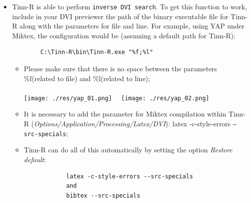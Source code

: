\begin{itemize}
  \item Tinn-R is able to perform \texttt{inverse DVI search}. To get this
    function to work, include in your DVI previewer the path of the
    binary executable file for Tinn-R along with the parameters for
    file and line.  For example, using YAP under Miktex, the configuration
    would be (assuming a default path for Tinn-R):

    \begin{footnotesize}
      \begin{verbatim}
        C:\Tinn-R\bin\Tinn-R.exe "%f;%l"
      \end{verbatim}
    \end{footnotesize}

    \begin{itemize}
      \item Please make sure that there is no space between the
        parameters \%f(related to file) and \%l(related to line);\\\\
        \texttt{[image: ./res/yap\_01.png]}~~
        \texttt{[image: ./res/yap\_02.png]}\\
      \item It is necessary to add the parameter for Miktex compilation
        within Tinn-R (\textit{Options/Application/Processing/Latex/DVI}):
        latex -c-style-errors \texttt{--src-specials};
      \item Tinn-R can do all of this automatically by setting the
        option \textit{Restore default}:

        \begin{footnotesize}
          \begin{verbatim}
            latex -c-style-errors --src-specials
            and
            bibtex --src-specials
          \end{verbatim}
        \end{footnotesize}


\end{itemize}
\end{itemize}
